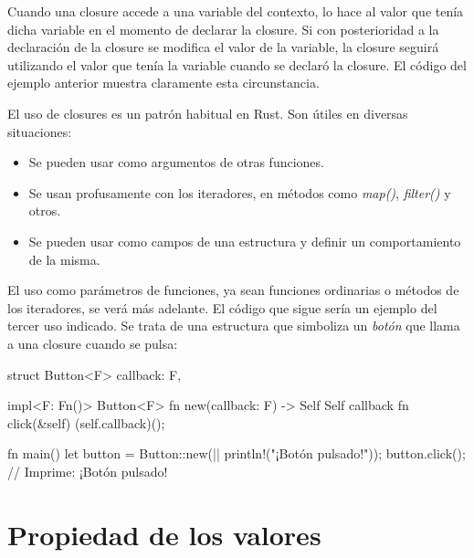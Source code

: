 Cuando una closure accede a una variable del contexto, lo hace al valor que tenía dicha variable en el momento de declarar la closure. Si con posterioridad a la declaración de la closure se modifica el valor de la variable, la closure seguirá utilizando el valor que tenía la variable cuando se declaró la closure. El código del ejemplo anterior muestra claramente esta circunstancia.


El uso de closures es un patrón habitual en Rust. Son útiles en diversas situaciones:

\begin{itemize}
   \item Se pueden usar como argumentos de otras funciones.
   \item Se usan profusamente con los iteradores, en métodos como \textit{map()}, \textit{filter()} y otros.
   \item Se pueden usar como campos de una estructura y definir un comportamiento de la misma.
\end{itemize}

El uso como parámetros de funciones, ya sean funciones ordinarias o métodos de los iteradores, se verá más adelante. El código que sigue sería un ejemplo del tercer uso indicado. Se trata de una estructura que simboliza un \textit{botón} que llama a una closure cuando se pulsa:

\vspace{0.7em}
\begin{Codigo}
struct Button<F> {
   callback: F,
}

impl<F: Fn()> Button<F> {
   fn new(callback: F) -> Self {
      Self { callback }
   }
   fn click(&self) {
      (self.callback)();
   }
}

fn main() {
   let button = Button::new(|| println!("¡Botón pulsado!"));
   button.click();  // Imprime: ¡Botón pulsado!
}
\end{Codigo}






\chapter{Propiedad de los valores}
\label{ch_propiedad}

\IndiceCapitulo

